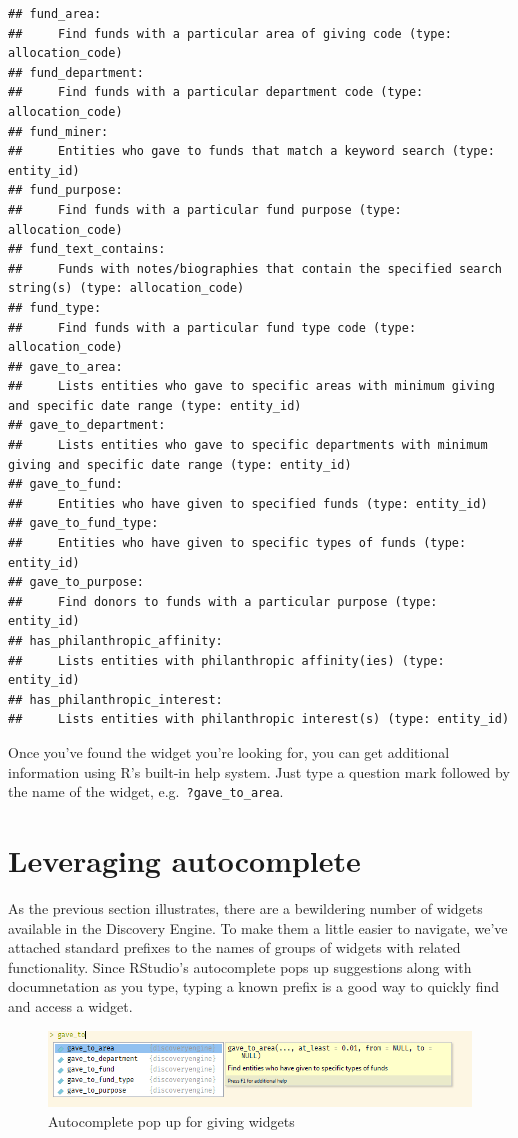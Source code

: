 \documentclass[]{book}
\begin{document}
\begin{verbatim}
## fund_area:
##     Find funds with a particular area of giving code (type: allocation_code)
## fund_department:
##     Find funds with a particular department code (type: allocation_code)
## fund_miner:
##     Entities who gave to funds that match a keyword search (type: entity_id)
## fund_purpose:
##     Find funds with a particular fund purpose (type: allocation_code)
## fund_text_contains:
##     Funds with notes/biographies that contain the specified search string(s) (type: allocation_code)
## fund_type:
##     Find funds with a particular fund type code (type: allocation_code)
## gave_to_area:
##     Lists entities who gave to specific areas with minimum giving and specific date range (type: entity_id)
## gave_to_department:
##     Lists entities who gave to specific departments with minimum giving and specific date range (type: entity_id)
## gave_to_fund:
##     Entities who have given to specified funds (type: entity_id)
## gave_to_fund_type:
##     Entities who have given to specific types of funds (type: entity_id)
## gave_to_purpose:
##     Find donors to funds with a particular purpose (type: entity_id)
## has_philanthropic_affinity:
##     Lists entities with philanthropic affinity(ies) (type: entity_id)
## has_philanthropic_interest:
##     Lists entities with philanthropic interest(s) (type: entity_id)
\end{verbatim}

Once you've found the widget you're looking for, you can get additional information using R's built-in help system. Just type a question mark followed by the name of the widget, e.g.~\texttt{?gave\_to\_area}.

\hypertarget{working-with-autocomplete}{%
\section{Leveraging autocomplete}\label{working-with-autocomplete}}

As the previous section illustrates, there are a bewildering number of widgets available in the Discovery Engine. To make them a little easier to navigate, we've attached standard prefixes to the names of groups of widgets with related functionality. Since RStudio's autocomplete pops up suggestions along with documnetation as you type, typing a known prefix is a good way to quickly find and access a widget.

\begin{figure}
\centering
\includegraphics{images/gave-to-autocomplete.png}
\caption{Autocomplete pop up for giving widgets}
\end{figure}
\end{document}
